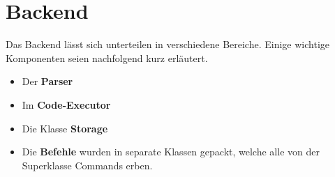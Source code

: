 \chapter{Backend}

Das Backend lässt sich unterteilen in verschiedene Bereiche. Einige wichtige Komponenten seien nachfolgend kurz erläutert.
\begin{itemize}
	\item Der \textbf{Parser} 
	\item Im \textbf{Code-Executor} 
	\item Die Klasse \textbf{Storage} 
	\item Die \textbf{Befehle} wurden in separate Klassen gepackt, welche alle von der Superklasse Commands erben.  
\end{itemize}